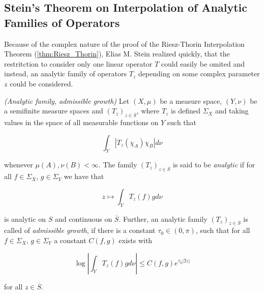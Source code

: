 \subsection{Stein's Theorem on Interpolation of Analytic Families of Operators}
Because of the complex nature of the proof of the Riesz-Thorin Interpolation Theorem (\ref{thm:Riesz_Thorin}), Elias M. Stein realized quickly, that the restritction to consider only one linear operator $T$ could easily be omited and instead, an analytic family of operators $T_z$ depending on some complex parameter $z$ could be considered.

\vspace{2mm}

\begin{mdframed}
	\begin{definition}\emph{(Analytic family, admissible growth)}
		Let $(X,\mu)$ be a measure space, $(Y,\nu)$ be a semifinite measure spaces and $\left( T_z \right)_{z \in \overline{S}}$, where $T_z$ is defined $\Sigma_X$ and taking values in the space of all measurable functions on $Y$ such that

		\begin{equation}
			\int_Y \left| T_z(\chi_A)\chi_B \right| d\nu
		\end{equation}

		whenever $\mu(A),\nu(B) < \infty$. The family $\left( T_z \right)_{z \in \overline{S}}$ is said to be \emph{analytic} if for all $f \in \Sigma_X$, $g \in \Sigma_Y$ we have that

		\begin{equation}
			z \mapsto \int_Y T_z(f)gd\nu
		\end{equation}

		is analytic on $S$ and continuous on $\overline{S}$. Further, an analytic family $\left( T_z \right)_{z \in \overline{S}}$ is called of \emph{admissible growth}, if there is a constant $\tau_0 \in (0,\pi)$, such that for all $f \in \Sigma_X$, $g \in \Sigma_Y$ a constant $C(f,g)$ exists with

			\begin{equation}
				\log\left| \int_Y T_z(f) g d\nu\right| \leqslant C(f,g)e^{\tau_0\left| \Im z\right|}
			\end{equation}

			for all $z \in \overline{S}$.
	\end{definition}
\end{mdframed}

\vspace{2mm}

